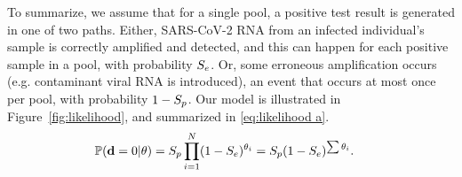 \documentclass{article}
\begin{document}
To summarize, we assume that for a single pool, a positive test result
is generated in one of two paths. Either, SARS-CoV-2 RNA from an
infected individual's sample is correctly amplified and detected, and
this can happen for each positive sample in a pool, with probability
$S_e$. Or, some erroneous amplification occurs (e.g. contaminant viral
RNA is introduced), an event that occurs at most once per pool, with
probability $1-S_p$. Our model is illustrated in
Figure~\ref{fig:likelihood}, and summarized in
\eqref{eq:likelihood a}.%
\begin{align}%
    \Pr(\data=0 | \theta) &= \spec\prod_{i=1}^N
    (1-\sens)^{\theta_i} = \spec(1-\Se)^{\sum\theta_i}. \label{eq:likelihood a}
\end{align}

\end{document}
